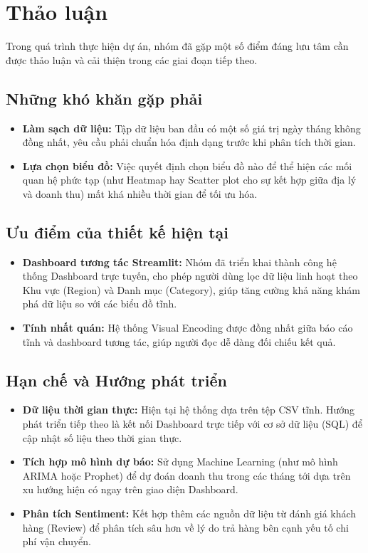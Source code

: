\section{Thảo luận}

Trong quá trình thực hiện dự án, nhóm đã gặp một số điểm đáng lưu tâm cần được thảo luận và cải thiện trong các giai đoạn tiếp theo.

\subsection{Những khó khăn gặp phải}

\begin{itemize}
    \item \textbf{Làm sạch dữ liệu:} Tập dữ liệu ban đầu có một số giá trị ngày tháng không đồng nhất, yêu cầu phải chuẩn hóa định dạng trước khi phân tích thời gian.
    \item \textbf{Lựa chọn biểu đồ:} Việc quyết định chọn biểu đồ nào để thể hiện các mối quan hệ phức tạp (như Heatmap hay Scatter plot cho sự kết hợp giữa địa lý và doanh thu) mất khá nhiều thời gian để tối ưu hóa.
\end{itemize}

\subsection{Ưu điểm của thiết kế hiện tại}
\begin{itemize}
    \item \textbf{Dashboard tương tác Streamlit:} Nhóm đã triển khai thành công hệ thống Dashboard trực tuyến, cho phép người dùng lọc dữ liệu linh hoạt theo Khu vực (Region) và Danh mục (Category), giúp tăng cường khả năng khám phá dữ liệu so với các biểu đồ tĩnh.
    \item \textbf{Tính nhất quán:} Hệ thống Visual Encoding được đồng nhất giữa báo cáo tĩnh và dashboard tương tác, giúp người đọc dễ dàng đối chiếu kết quả.
\end{itemize}

\subsection{Hạn chế và Hướng phát triển}
\begin{itemize}
    \item \textbf{Dữ liệu thời gian thực:} Hiện tại hệ thống dựa trên tệp CSV tĩnh. Hướng phát triển tiếp theo là kết nối Dashboard trực tiếp với cơ sở dữ liệu (SQL) để cập nhật số liệu theo thời gian thực.
    \item \textbf{Tích hợp mô hình dự báo:} Sử dụng Machine Learning (như mô hình ARIMA hoặc Prophet) để dự đoán doanh thu trong các tháng tới dựa trên xu hướng hiện có ngay trên giao diện Dashboard.
    \item \textbf{Phân tích Sentiment:} Kết hợp thêm các nguồn dữ liệu từ đánh giá khách hàng (Review) để phân tích sâu hơn về lý do trả hàng bên cạnh yếu tố chi phí vận chuyển.
\end{itemize}
